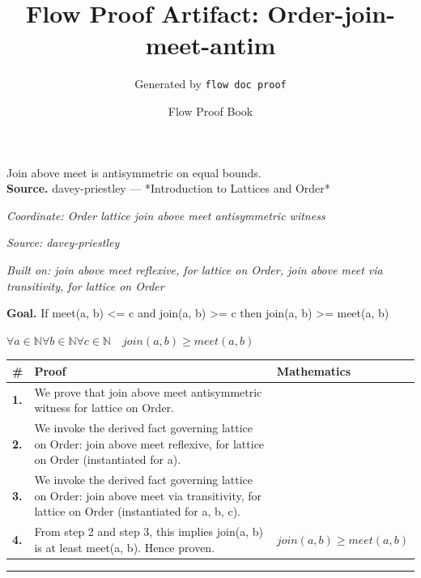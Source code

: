 \documentclass[11pt]{article}
\title{Flow Proof Artifact: Order-join-meet-antim}
\author{Generated by \texttt{flow doc proof}}
\date{Flow Proof Book}
\theoremstyle{definition}
\begin{document}
\maketitle
Join above meet is antisymmetric on equal bounds.\\[0.5em]
\textbf{Source.} davey-priestley — *Introduction to Lattices and Order*\\[0.5em]
\bigskip
{}\par
\smallskip\noindent\textit{Coordinate: Order \cdot lattice \cdot join above meet antisymmetric witness}\par
\smallskip\noindent\textit{Source: davey-priestley}\par
\smallskip\noindent\textit{Built on: join above meet reflexive, for lattice on Order, join above meet via transitivity, for lattice on Order}\par
\medskip
\noindent\textbf{Goal.} If meet(a, b) <= c and join(a, b) >= c then join(a, b) >= meet(a, b)\par
\noindent$\displaystyle \forall a \in \mathbb{N} \forall b \in \mathbb{N} \forall c \in \mathbb{N}\quad join(a, b) \ge meet(a, b)$\par
\medskip
\noindent
\begin{tabular}{@{} >{\raggedright\arraybackslash}p{} >{\raggedright\arraybackslash}p{} >{\raggedleft\arraybackslash}p{} @{}}
\textbf{\#} & \textbf{Proof} & \textbf{Mathematics} \\
\midrule
\textbf{1.} & We prove that join above meet antisymmetric witness for lattice on Order. & \\[0.45em]
\textbf{2.} & We invoke the derived fact governing lattice on Order: join above meet reflexive, for lattice on Order (instantiated for a). & \\[0.45em]
\textbf{3.} & We invoke the derived fact governing lattice on Order: join above meet via transitivity, for lattice on Order (instantiated for a, b, c). & \\[0.45em]
\textbf{4.} & From step 2 and step 3, this implies join(a, b) is at least meet(a, b). Hence proven. & $\displaystyle join(a, b) \ge meet(a, b)$ \\[0.45em]
\bottomrule
\end{tabular}
\label{thm:Order-lattice-join_above_meet_antisymmetric_witness}
\par\medskip\hrule
\end{document}

